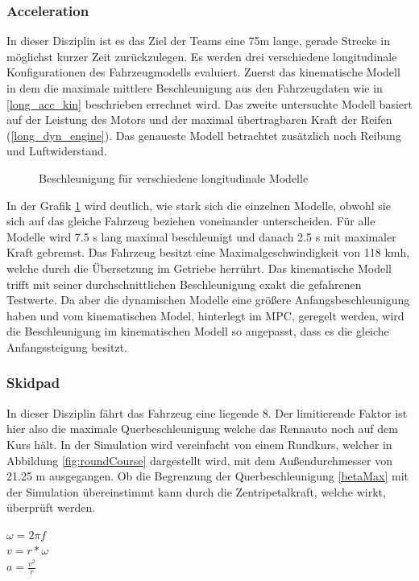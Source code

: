 \documentclass{like}
\begin{document}
\subsubsection*{Acceleration}
In dieser Disziplin ist es das Ziel der Teams eine 75m lange, gerade Strecke in möglichst kurzer Zeit zurückzulegen.
Es werden drei verschiedene longitudinale Konfigurationen des Fahrzeugmodells evaluiert. Zuerst das kinematische Modell in dem die maximale mittlere Beschleunigung aus den Fahrzeugdaten wie in \ref{long_acc_kin} beschrieben errechnet wird. Das zweite untersuchte Modell basiert auf der Leistung des Motors und der maximal übertragbaren Kraft der Reifen (\ref{long_dyn_engine}).
Das genaueste Modell betrachtet zusätzlich noch Reibung und Luftwiderstand. 


\begin{figure}
	\centering
	 
	\caption{Beschleunigung für verschiedene longitudinale Modelle}
	\label{fig:accdec}
\end{figure}

In der Grafik \ref{fig:accdec} wird deutlich, wie stark sich die einzelnen Modelle, obwohl sie sich auf das gleiche Fahrzeug beziehen voneinander unterscheiden. Für alle Modelle wird 7.5 s lang maximal beschleunigt und danach 2.5 s mit maximaler Kraft gebremst. Das Fahrzeug besitzt eine Maximalgeschwindigkeit von 118 kmh, welche durch die Übersetzung im Getriebe herrührt. Das kinematische Modell trifft mit seiner durchschnittlichen Beschleunigung exakt die gefahrenen Testwerte. Da aber die dynamischen Modelle eine größere Anfangsbeschleunigung haben und vom kinematischen Model, hinterlegt im MPC, geregelt werden, wird die Beschleunigung im kinematischen Modell so angepasst, dass es die gleiche Anfangssteigung besitzt.

\subsubsection*{Skidpad}
In dieser Disziplin fährt das Fahrzeug eine liegende 8. Der limitierende Faktor ist hier also die maximale Querbeschleunigung welche das Rennauto noch auf dem Kurs hält. In der Simulation wird vereinfacht von einem Rundkurs, welcher in Abbildung \ref{fig:roundCourse} dargestellt wird, mit dem Außendurchmesser von 21.25 m ausgegangen. Ob die Begrenzung der Querbeschleunigung \ref{betaMax} mit der Simulation übereinstimmt kann durch die Zentripetalkraft, welche wirkt, überprüft werden.

$ \omega = 2 \pi f$ \\
$ v = r * \omega $\\
$a = \frac{v^2}{r}$\\
\end{document}
